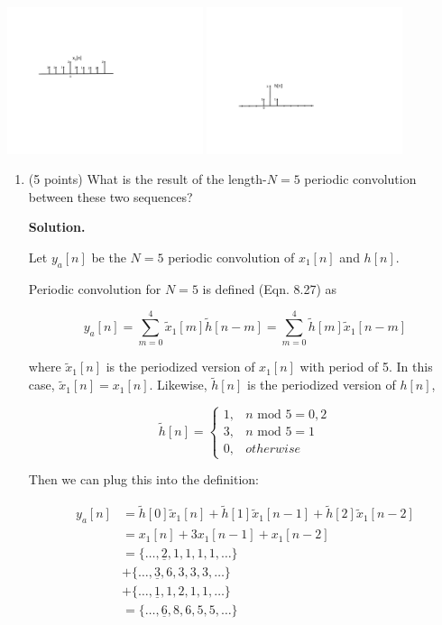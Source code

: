 \documentclass[]{siamltex}
\begin{document}
\begin{enumerate}
 \includegraphics[width=0.43\textwidth]{x1}  \includegraphics[width=0.43\textwidth]{h}


\begin{enumerate} 
\item (5 points) What is the result of the length-$N=5$ periodic convolution between these two sequences?

\textbf{Solution.} 

Let $y_a[n]$ be the $N=5$ periodic convolution of $x_1[n]$ and $h[n]$. 

Periodic convolution for $N=5$ is defined (Eqn. 8.27) as 

\[ y_a[n] = \sum_{m=0}^4 \tilde{x}_1[m] \tilde{h}[n-m] = \sum_{m=0}^4 \tilde{h}[m] \tilde{x}_1[n-m]\]

where $\tilde{x}_1[n]$ is the periodized version of $x_1[n]$ with period of 5. In this case, $\tilde{x}_1[n] = x_1[n]$. Likewise, $\tilde{h}[n]$ is the periodized version of $h[n]$,

\[ \tilde{h}[n] = \begin{cases} 1,& n\text{ mod }5 = 0,2\\
3,& n\text{ mod }5=1\\ 0,& otherwise \end{cases} \]

Then we can plug this into the definition:

\begin{align*}
y_a[n] &= \tilde{h}[0] \tilde{x}_1[n] + \tilde{h}[1] \tilde{x}_1[n-1] + \tilde{h}[2] \tilde{x}_1[n-2] \\ 
&= x_1[n] + 3 x_1[n-1] + x_1[n-2] \\
&= \{\ldots, \underline{2}, 1, 1, 1, 1, \ldots\} \\
& + \{\ldots, \underline{3}, 6, 3, 3, 3, \ldots\} \\
& + \{\ldots, \underline{1}, 1, 2, 1, 1, \ldots\} \\
&= \{\ldots, \underline{6}, 8, 6, 5, 5, \ldots\} \\
\end{align*}


\end{enumerate}
\end{enumerate}
\end{document}
